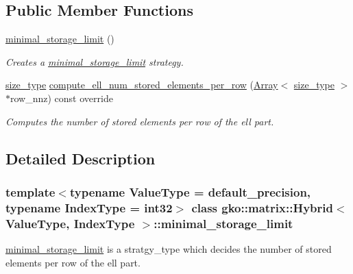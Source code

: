 \subsection*{Public Member Functions}
\begin{DoxyCompactItemize}
\item 
\mbox{\label{classgko_1_1matrix_1_1Hybrid_1_1minimal__storage__limit_ac7851b3c053f239e98e197cc2ef81f1e}} 
\hyperlink{classgko_1_1matrix_1_1Hybrid_1_1minimal__storage__limit_ac7851b3c053f239e98e197cc2ef81f1e}{minimal\+\_\+storage\+\_\+limit} ()
\begin{DoxyCompactList}\small\item\em Creates a \hyperlink{classgko_1_1matrix_1_1Hybrid_1_1minimal__storage__limit}{minimal\+\_\+storage\+\_\+limit} strategy. \end{DoxyCompactList}\item 
\hyperlink{namespacegko_a6e5c95df0ae4e47aab2f604a22d98ee7}{size\+\_\+type} \hyperlink{classgko_1_1matrix_1_1Hybrid_1_1minimal__storage__limit_a381273c294099363637e40cb536fa63a}{compute\+\_\+ell\+\_\+num\+\_\+stored\+\_\+elements\+\_\+per\+\_\+row} (\hyperlink{classgko_1_1Array}{Array}$<$ \hyperlink{namespacegko_a6e5c95df0ae4e47aab2f604a22d98ee7}{size\+\_\+type} $>$ $\ast$row\+\_\+nnz) const override
\begin{DoxyCompactList}\small\item\em Computes the number of stored elements per row of the ell part. \end{DoxyCompactList}\end{DoxyCompactItemize}


\subsection{Detailed Description}
\subsubsection*{template$<$typename Value\+Type = default\+\_\+precision, typename Index\+Type = int32$>$\newline
class gko\+::matrix\+::\+Hybrid$<$ Value\+Type, Index\+Type $>$\+::minimal\+\_\+storage\+\_\+limit}

\hyperlink{classgko_1_1matrix_1_1Hybrid_1_1minimal__storage__limit}{minimal\+\_\+storage\+\_\+limit} is a stratgy\+\_\+type which decides the number of stored elements per row of the ell part. 

